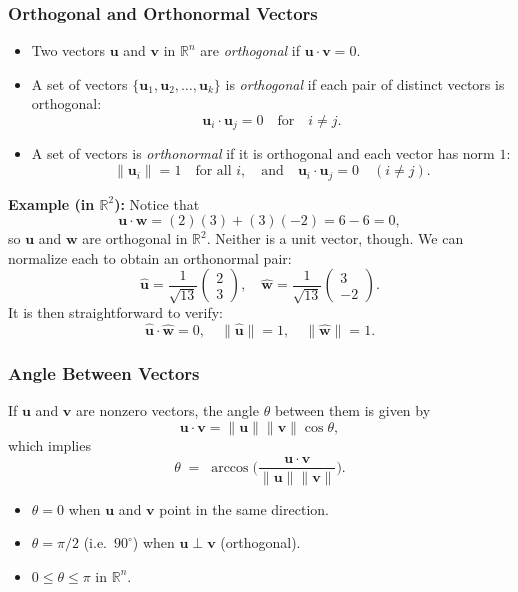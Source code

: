 \subsubsection{Orthogonal and Orthonormal Vectors}
\begin{itemize}
\item Two vectors $\mathbf{u}$ and $\mathbf{v}$ in $\mathbb{R}^n$ are \emph{orthogonal} 
      if $\mathbf{u} \cdot \mathbf{v} = 0$.
\item A set of vectors $\{\mathbf{u}_1, \mathbf{u}_2, \dots, \mathbf{u}_k\}$ is 
      \emph{orthogonal} if each pair of distinct vectors is orthogonal:
      \[
         \mathbf{u}_i \cdot \mathbf{u}_j = 0 \quad \text{for} \quad i \neq j.
      \]
\item A set of vectors is \emph{orthonormal} if it is orthogonal and each vector has norm $1$:
      \[
         \|\mathbf{u}_i\| = 1 \quad \text{for all } i, 
         \quad \text{and} \quad
         \mathbf{u}_i \cdot \mathbf{u}_j = 0 \quad (i \neq j).
      \]
\end{itemize}

\noindent
\textbf{Example (in $\mathbb{R}^2$):}
Notice that 
\[
\mathbf{u} \cdot \mathbf{w}
= (2)(3) + (3)(-2)
= 6 - 6
= 0,
\]
so $\mathbf{u}$ and $\mathbf{w}$ are orthogonal in $\mathbb{R}^2$. 
Neither is a unit vector, though. We can normalize each to obtain an orthonormal pair:
\[
\widehat{\mathbf{u}} = \frac{1}{\sqrt{13}}\begin{pmatrix} 2 \\ 3 \end{pmatrix}, 
\quad
\widehat{\mathbf{w}} = \frac{1}{\sqrt{13}}\begin{pmatrix} 3 \\ -2 \end{pmatrix}.
\]
It is then straightforward to verify:
\[
\widehat{\mathbf{u}} \cdot \widehat{\mathbf{w}} = 0,
\quad
\|\widehat{\mathbf{u}}\|=1,
\quad
\|\widehat{\mathbf{w}}\|=1.
\]

\subsubsection{Angle Between Vectors}
If $\mathbf{u}$ and $\mathbf{v}$ are nonzero vectors, the angle $\theta$ between them 
is given by
\[
\mathbf{u} \cdot \mathbf{v} = \|\mathbf{u}\| \|\mathbf{v}\| \cos \theta,
\]
which implies
\[
\theta \;=\; \arccos\!\biggl(\frac{\mathbf{u} \cdot \mathbf{v}}{\|\mathbf{u}\|\|\mathbf{v}\|}\biggr).
\]
\begin{itemize}
\item $\theta = 0$ when $\mathbf{u}$ and $\mathbf{v}$ point in the same direction.
\item $\theta = \pi/2$ (i.e.\ $90^\circ$) when $\mathbf{u} \perp \mathbf{v}$ (orthogonal).
\item $0 \le \theta \le \pi$ in $\mathbb{R}^n$.
\end{itemize}

